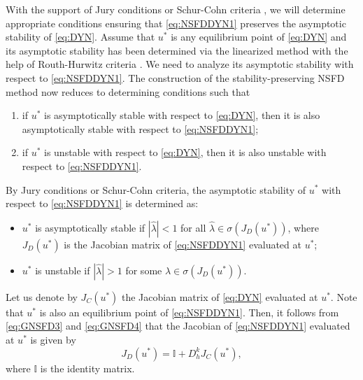 \documentclass[12pt]{article}
\theoremstyle{definition}
\theoremstyle{remark}
\numberwithin{equation}{section}
\begin{document}
With the support of Jury conditions or Schur-Cohn criteria \cite{Allen, Gantmacher}, we will determine appropriate conditions ensuring that \eqref{eq:NSFDDYN1} preserves the asymptotic stability of \eqref{eq:DYN}. Assume that $u^*$ is any equilibrium point of \eqref{eq:DYN} and its asymptotic stability has been determined via the linearized method with the help of Routh-Hurwitz criteria \cite{Allen}. We need to analyze its asymptotic stability with respect to \eqref{eq:NSFDDYN1}. The construction of the stability-preserving NSFD method now reduces to determining conditions such that
\begin{enumerate}
\item[(i)] if $u^*$ is asymptotically stable with respect to \eqref{eq:DYN}, then it is also asymptotically stable with respect to \eqref{eq:NSFDDYN1};
\item[(ii)] if $u^*$ is unstable with respect to \eqref{eq:DYN}, then it is also unstable with respect to \eqref{eq:NSFDDYN1}.
\end{enumerate}
By Jury conditions or Schur-Cohn criteria, the asymptotic stability of $u^*$ with respect to \eqref{eq:NSFDDYN1} is determined as:
\begin{itemize}
\item $u^*$ is asymptotically stable if $|\widehat{\lambda}| < 1$ for all $\widehat{\lambda} \in \sigma(J_D(u^*))$, where $J_D(u^*)$ is the Jacobian matrix of \eqref{eq:NSFDDYN1} evaluated at $u^*$;
\item $u^*$ is unstable if $|\widehat{\lambda}| > 1$ for some $\widehat{\lambda} \in \sigma(J_D(u^*))$.
\end{itemize}
Let us denote by $J_C(u^*)$ the Jacobian matrix of \eqref{eq:DYN} evaluated at $u^*$. Note that $u^*$ is also an equilibrium point of \eqref{eq:NSFDDYN1}. Then, it follows from \eqref{eq:GNSFD3} and \eqref{eq:GNSFD4} that the Jacobian of \eqref{eq:NSFDDYN1} evaluated at $u^*$ is given by
\begin{equation}\label{eq:GNSFD6}
J_D(u^*) = \mathbb{I} + D^k_hJ_C(u^*),
\end{equation}
where $\mathbb{I}$ is the identity matrix.
\end{document}
